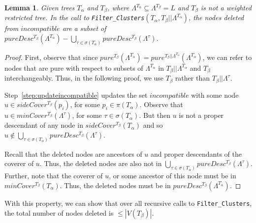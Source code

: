 \documentclass[final,1p,times]{elsarticle}
\newcommand{\leafset}{\Lambda}
\newcommand{\TA}{T_\alpha}
\newcommand{\TB}{T_\beta}
\newtheorem{lemma}[theorem]{Lemma}
\begin{document}
    \begin{lemma}
        \label{lem:numremovednodesrecursive}
        Given trees $\TA$ and $\TB$, where $\leafset^{\TA} \subseteq \leafset^{\TB} = L$ and $\TB$ is not a weighted restricted tree. In the call to \texttt{Filter\_Clusters}$(\TA, \TB||\leafset^{\TA})$, the nodes deleted from $incompatible$ are a subset of $pureDesc^{\TB}(\leafset^{\TA}) - \bigcup_{\tau \in \sigma(\TA)} pureDesc^{\TB}(\leafset^{\tau})$.
    \end{lemma}
        \begin{proof}
            First, observe that since $pure^{\TB}(\leafset^{\TA}) = pure^{\TB||\leafset^{\TA}}(\leafset^{\TA})$, we can refer to nodes that are pure with respect to subsets of $\leafset^{\TA}$ in $\TB||\leafset^{\TA}$ and $\TB$ interchangeably. Thus, in the following proof, we use $\TB$ rather than $\TB||\leafset^{\tau}$.

            Step~\ref{step:updateincompatible} updates the set $incompatible$ with some node $u \in sideCover^{\TB}(p_i)$, for some $p_i \in \pi(\TA)$. Observe that $u \in minCover^{\TB}(\leafset^{\tau})$, for some $\tau \in \sigma(\TA)$. But then $u$ is not a proper descendant of any node in $sideCover^{\TB}(\TA)$ and so $u \not\in \bigcup_{\tau \in \sigma(\TA)} pureDesc^{\TB}(\leafset^{\tau})$.

            Recall that the deleted nodes are ancestors of $u$ and proper descendants of the coverer of $u$. Thus, the deleted nodes are also not in $\bigcup_{\tau \in \sigma(\TA)} pureDesc^{\TB}(\leafset^{\tau})$. Further, note that the coverer of $u$, or some ancestor of this node must be in $minCover^{\TB}(\TA)$. Thus, the deleted nodes must be in $pureDesc^{\TB}(\leafset^{\TA})$.
        \end{proof}

    With this property, we can show that over all recursive calls to \texttt{Filter\_Clusters}, the total number of nodes deleted is $\leq |V(\TB)|$.
    \newline
\end{document}
